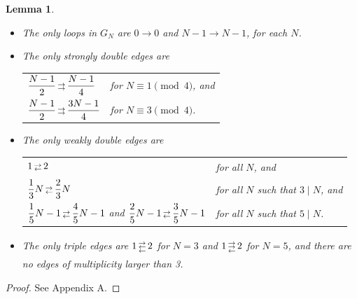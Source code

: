 \documentclass[10pt]{article}
\makeatletter
\newtheorem{lemma}{Lemma}
\theoremstyle{definition}
\newcommand{\myrightarrow}{{\scriptstyle\rightarrow}}
\newcommand{\myleftarrow}{{\scriptstyle\leftarrow}}
\newcommand{\rrarrow}{\begin{array}{@{\,}c@{\,}} \myrightarrow \\[-8pt] \myrightarrow \end{array}}
\newcommand{\rlarrow}{\begin{array}{@{\,}c@{\,}} \myrightarrow \\[-8pt] \myleftarrow \end{array}}
\newcommand{\rllarrow}{\begin{array}{@{\,}c@{\,}} \myrightarrow \\[-8pt] \myrightarrow \\[-8pt]
        \myleftarrow \end{array}}
\newcommand{\rrlarrow}{\begin{array}{@{\,}c@{\,}} \myrightarrow \\[-8pt] \myleftarrow \\[-8pt]
        \myleftarrow \end{array}}
\makeatother
\begin{document}
\begin{lemma} \label{lem:multipleedges}\
    \begin{itemize}
        \item[\emph{\textbf{(a)}}]
        The only loops in $ G_N $ are $ 0 \to 0 $ and $ N-1 \to N-1 $, for each $ N $.
        \item[\emph{\textbf{(b)}}]
        The only strongly double edges are \\[1mm]
        \begin{tabular}{ll}
            $ \dfrac{N-1}{2} \rrarrow \dfrac{N-1}{4} $  & for $ N \equiv 1 \pmod{4} $, and \\[3mm]
            $ \dfrac{N-1}{2} \rrarrow \dfrac{3N-1}{4} $ & for $ N \equiv 3 \pmod{4} $.
        \end{tabular}
        \item[\emph{\textbf{(c)}}]
        The only weakly double edges are \\[1mm]
        \begin{tabular}{ll}
            $ 1 \rlarrow 2 $ & for all $ N $, and \\
            $ \dfrac{1}{3} N \rlarrow \dfrac{2}{3} N $ & for all $ N $ such that $ 3 \mid N $, and \\[3mm]
            $ \dfrac{1}{5} N - 1 \rlarrow \dfrac{4}{5} N - 1 $ and
            $ \dfrac{2}{5} N - 1 \rlarrow \dfrac{3}{5} N - 1 $ & for all $ N $ such that $ 5 \mid N $. \\
        \end{tabular}
        \item[\emph{\textbf{(d)}}]
        The only triple edges are $ 1 \rrlarrow 2 $ for $ N = 3 $ and $ 1 \rllarrow 2 $ for $ N = 5 $, and
        there are no edges of multiplicity larger than 3.
    \end{itemize}
\end{lemma}

\begin{proof}
    See Appendix A.
\end{proof}
\end{document}
